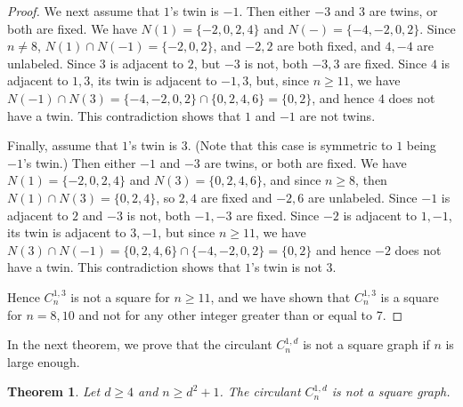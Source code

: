 \documentclass{article}
\newtheorem{theorem}{Theorem}[section]
\theoremstyle{definition}
\begin{document}
\begin{proof}
We next assume that $1$'s twin is $-1$. Then either $-3$ and $3$ are twins, or both are fixed. We have $N(1)=\{-2,0,2,4\}$ and $N(-)=\{-4,-2,0,2\}$. 
Since $n\neq 8$, $N(1)\cap N(-1) =\{-2,0,2\}$, and $-2,2$ are both fixed, and $4,-4$ are unlabeled. Since $3$ is adjacent to $2$, but $-3$ is not, both $-3,3$ are fixed. Since $4$ is adjacent to $1,3$, its twin is adjacent to $-1,3$, but, since $n\geq 11$, we have $N(-1)\cap N(3) =\{-4,-2,0,2\}\cap \{0,2,4,6\}=\{0,2\}$, and hence $4$ does not have a twin. This contradiction shows that $1$ and $-1$ are not twins.

Finally, assume that $1$'s twin is $3$. (Note that this case is symmetric to $1$ being $-1$'s twin.) Then either $-1$ and $-3$ are twins, or both are fixed. We have $N(1)=\{-2,0,2,4\}$ and $N(3)=\{0,2,4,6\}$, and since $n\geq 8$, then $N(1)\cap N(3) =\{0,2,4\}$, so $2,4$ are fixed and $-2, 6$ are unlabeled. Since $-1$ is adjacent to $2$ and $-3$ is not, both $-1,-3$ are fixed. Since $-2$ is adjacent to $1, -1$, its twin 
is adjacent to $3,-1$, but since $n\geq 11$, we have $N(3)\cap N(-1)=\{0,2,4,6\}\cap \{-4,-2,0,2\} = \{0,2\} $ and hence $-2$ does not have a twin. This contradiction shows that $1$'s twin is not $3$.

Hence $C_n^{1,3}$ is not a square for $n\geq 11$, and we have shown that 
$C_n^{1,3}$ is a square for $n=8,10$ and not for any other integer greater than or equal to 7. \end{proof}

In the next theorem, we prove that the circulant $C_{n}^{1,d}$ is not a square graph if $n$ is large enough. 

\begin{theorem} \label{thm:circ-1-d} Let $d\geq 4$ and $n\geq d^2+1$.  The circulant $C_{n}^{1,d}$ is not a square graph. 
\end{theorem}
\end{document}
